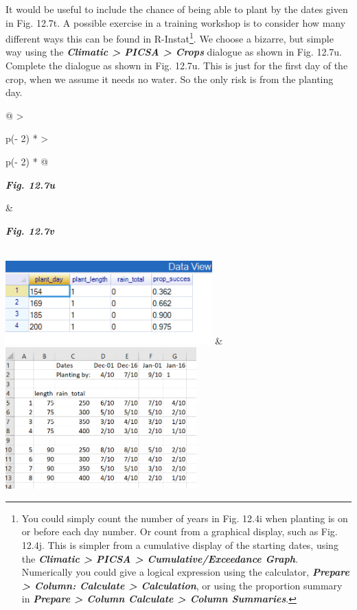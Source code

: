 \documentclass[
  letterpaper,
  DIV=11,
  numbers=noendperiod]{scrreprt}
\begin{document}
It would be useful to include the chance of being able to plant by the
dates given in Fig. 12.7t. A possible exercise in a training workshop is
to consider how many different ways this can be found in
R-Instat\footnote{You could simply count the number of years in Fig.
  12.4i when planting is on or before each day number. Or count from a
  graphical display, such as Fig. 12.4j. This is simpler from a
  cumulative display of the starting dates, using the
  \textbf{\emph{Climatic \textgreater{} PICSA \textgreater{}
  Cumulative/Exceedance Graph}}. Numerically you could give a logical
  expression using the calculator, \textbf{\emph{Prepare \textgreater{}
  Column: Calculate \textgreater{} Calculation}}, or using the
  proportion summary in \textbf{\emph{Prepare \textgreater{} Column
  Calculate \textgreater{} Column Summaries}}.}. We choose a bizarre,
but simple way using the \textbf{\emph{Climatic \textgreater{} PICSA
\textgreater{} Crops}} dialogue as shown in Fig. 12.7u. Complete the
dialogue as shown in Fig. 12.7u. This is just for the first day of the
crop, when we assume it needs no water. So the only risk is from the
planting day.

\begin{longtable}[]{@{}
  >{\raggedright\arraybackslash}p{(\columnwidth - 2\tabcolsep) * }
  >{\raggedright\arraybackslash}p{(\columnwidth - 2\tabcolsep) * }@{}}
\toprule\noalign{}
\begin{minipage}[b]{\linewidth}\raggedright
\textbf{\emph{Fig. 12.7u}}
\end{minipage} & \begin{minipage}[b]{\linewidth}\raggedright
\textbf{\emph{Fig. 12.7v}}
\end{minipage} \\
\midrule\noalign{}
\endhead
\bottomrule\noalign{}
\endlastfoot
\includegraphics[width=3.13081in,height=1.27005in]{figures/Fig12.7u.png}
&
\includegraphics[width=2.89795in,height=2.14282in]{figures/Fig12.7v.png} \\
\end{longtable}
\end{document}
